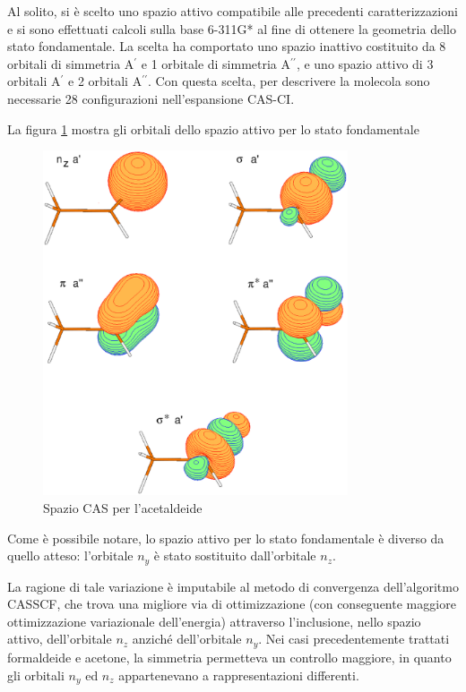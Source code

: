 Al solito, si \`e scelto uno spazio attivo compatibile alle precedenti
caratterizzazioni e si sono effettuati calcoli sulla base 6-311G* al fine di
ottenere la geometria dello stato fondamentale. 
La scelta ha comportato uno spazio inattivo costituito da 8 orbitali di
simmetria A$^{\prime}$ e 1 orbitale di simmetria A$^{\prime\prime}$, e uno
spazio attivo di 3 orbitali A$^{\prime}$ e 2 orbitali A$^{\prime\prime}$.
Con questa scelta, per descrivere la molecola sono necessarie 28
configurazioni nell'espansione CAS-CI.

La figura \ref{fig:acetaldeide_orbitali_5} mostra gli orbitali dello spazio
attivo per lo stato fondamentale

\begin{figure}[htb]
\caption{\small Spazio CAS per l'acetaldeide}
\label{fig:acetaldeide_orbitali_5}
\begin{center}
\includegraphics[width=9cm,keepaspectratio]{immagini/acetaldeide/orbitali_5.eps}
\end{center}
\end{figure}

\clearpage
Come \`e possibile notare, lo spazio attivo per lo stato fondamentale
\`e diverso da quello atteso: l'orbitale $n_y$ \`e stato
sostituito dall'orbitale $n_z$.

La ragione di tale variazione \`e imputabile al metodo di convergenza
dell'algoritmo CASSCF, che trova una migliore via di ottimizzazione (con
conseguente maggiore ottimizzazione variazionale dell'energia) attraverso
l'inclusione, nello spazio attivo, dell'orbitale $n_z$ anzich\'e dell'orbitale
$n_y$. Nei casi precedentemente trattati formaldeide e acetone, la simmetria
permetteva un controllo maggiore, in quanto gli orbitali $n_y$ ed $n_z$
appartenevano a rappresentazioni differenti.

